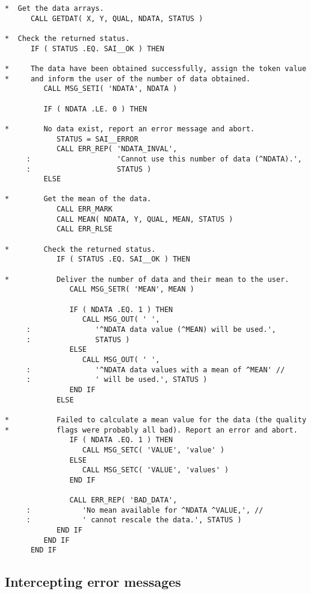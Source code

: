 \begin{verbatim}
*  Get the data arrays.
      CALL GETDAT( X, Y, QUAL, NDATA, STATUS )

*  Check the returned status.
      IF ( STATUS .EQ. SAI__OK ) THEN

*     The data have been obtained successfully, assign the token value 
*     and inform the user of the number of data obtained.
         CALL MSG_SETI( 'NDATA', NDATA )

         IF ( NDATA .LE. 0 ) THEN

*        No data exist, report an error message and abort.
            STATUS = SAI__ERROR
            CALL ERR_REP( 'NDATA_INVAL', 
     :                    'Cannot use this number of data (^NDATA).',
     :                    STATUS )
         ELSE

*        Get the mean of the data.
            CALL ERR_MARK
            CALL MEAN( NDATA, Y, QUAL, MEAN, STATUS )
            CALL ERR_RLSE

*        Check the returned status.
            IF ( STATUS .EQ. SAI__OK ) THEN

*           Deliver the number of data and their mean to the user.
               CALL MSG_SETR( 'MEAN', MEAN )

               IF ( NDATA .EQ. 1 ) THEN
                  CALL MSG_OUT( ' ', 
     :               '^NDATA data value (^MEAN) will be used.', 
     :               STATUS )
               ELSE
                  CALL MSG_OUT( ' ', 
     :               '^NDATA data values with a mean of ^MEAN' //
     :               ' will be used.', STATUS )
               END IF
            ELSE

*           Failed to calculate a mean value for the data (the quality
*           flags were probably all bad). Report an error and abort.
               IF ( NDATA .EQ. 1 ) THEN
                  CALL MSG_SETC( 'VALUE', 'value' )
               ELSE
                  CALL MSG_SETC( 'VALUE', 'values' )
               END IF

               CALL ERR_REP( 'BAD_DATA', 
     :            'No mean available for ^NDATA ^VALUE,', //
     :            ' cannot rescale the data.', STATUS )
            END IF
         END IF
      END IF
\end{verbatim}

\subsection {Intercepting error messages}

